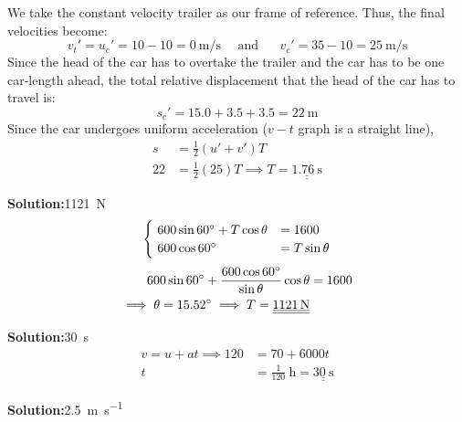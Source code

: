 \documentclass[11pt]{article}
\newcommand*\circled[1]{\tikz[baseline=(char.base)]{
		\node[shape=circle,draw,inner sep=2pt] (char) {#1};}}
\def\doubleunderline#1{\underline{\underline{#1}}}
\newcommand{\solution}[2]{\textbf{Solution:\hspace{1em}\circled{#1}}\hspace{1em}#2\hspace{1em}}
\begin{document}
\begin{enumerate}[label={[Q\arabic*]},itemsep={1em}]
			We take the constant velocity trailer as our frame of reference. Thus, the final velocities become:
			\vspace{-1em}
			\begin{equation*}
				v_t' = u_c' = 10-10 = \SI{0}{\meter\per\second} \text{~~~~and~~~~~}v_c' = 35-10 = \SI{25}{\meter\per\second}
			\end{equation*}
			Since the head of the car has to overtake the trailer and the car has to be one car-length ahead, the total relative displacement that the head of the car has to travel is:
			\begin{equation*}
				s_c' = 15.0 + 3.5 + 3.5 = \SI{22}{\meter}
			\end{equation*}
			Since the car undergoes uniform acceleration ($v-t$ graph is a straight line),
			\begin{align*}
				s &= \frac{1}{2} (u' + v') T \\
				22 &= \frac{1}{2} (25)T \implies T = \doubleunderline{\SI{1.76}{\second}}
			\end{align*}
		\item \solution{A}{\SI{1121}{\newton}}
			\begin{equation*}
				\begin{cases}
					~600\sin 60 \degree + T\cos\theta &= 1600 \\
					~600\cos 60 \degree &= T\sin\theta 
				\end{cases} 
			\end{equation*}
			\vspace{-1.5em}
			\begin{align*}
				600\sin 60 \degree + \frac{600\cos 60 \degree}{\sin\theta} \cos\theta &= 1600 \\
				\implies \theta = 15.52 \degree \implies T = \doubleunderline{\SI{1121}{\newton}}
			\end{align*}
		\item \solution{A}{\SI{30}{\second}}
			\vspace{-0.5cm}
			\begin{align*}
				v = u+at \implies 120 &= 70 + 6000t \\
				t &= \frac{1}{120}\SI{}{\hour} = \doubleunderline{\SI{30}{\second}}
			\end{align*}
		\item \solution{E}{\SI{2.5}{\meter\per\second}}
			\begin{multicols}{2}
				\noindent
				\begin{align*}

\end{align*}
\end{multicols}
\end{enumerate}
\end{document}
